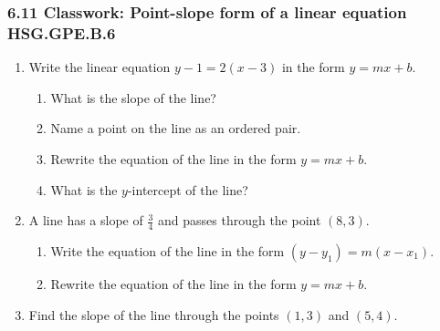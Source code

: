 

\fancyhead[LE]{\thepage}



\subsubsection*{6.11 Classwork: Point-slope form of a linear equation \hfill HSG.GPE.B.6}
\begin{enumerate}

\subsubsection*{Point-slope form: $(y-y_1)=m(x-x_1)$}
\item Write the linear equation $y-1=2(x-3)$ in the form $y=mx+b$. 
    \begin{enumerate}[itemsep=1cm]
        \item What is the slope of the line?
        \item Name a point on the line as an ordered pair.
        \item Rewrite the equation of the line in the form $y=mx+b$. \vspace{2cm}
        \item What is the $y$-intercept of the line?
    \end{enumerate} \vspace{1cm}

\item A line has a slope of $\displaystyle \frac{3}{4}$ and passes through the point $(8, 3)$. 
    \begin{enumerate}[itemsep=1cm]
        \item Write the equation of the line in the form $(y-y_1)=m(x-x_1)$.
        \item Rewrite the equation of the line in the form $y=mx+b$. \vspace{4cm}
    \end{enumerate}

\item Find the slope of the line through the points $(1, 3)$ and $(5, 4)$.


\end{enumerate}
